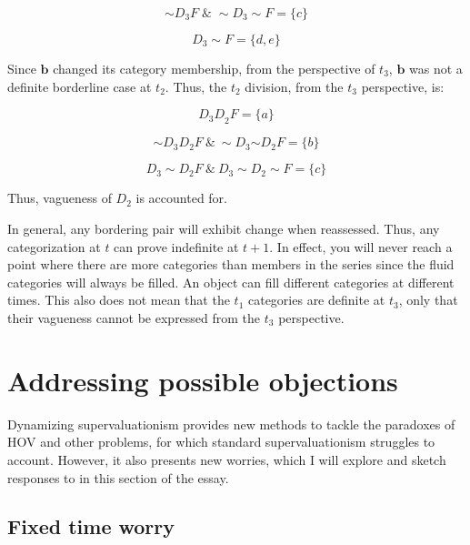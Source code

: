\[{\sim}D_{3}F \; \& \; {\sim}D_{3}{\sim}F = \{ c\}\]

\[D_{3}{\sim} F = \{ d,e\}\]

\begin{center}
  \end{center}
Since $\mathbf{b}$ changed its category membership, from the perspective
of \(t_{3}\), $\mathbf{b}$ was not a definite borderline case at
\(t_{2}\). Thus, the \(t_{2}\) division, from the \(t_{3}\) perspective,
is:

\[{D_{3}D}_{2}F = \{ a\}\]

\[\sim D_{3}D_{2}F\ \&\ \sim D_{3}{\sim D}_{2}F = \{ b\}\]

\[D_{3}\sim D_{2}F\ \&\ D_{3}\sim D_{2}\sim F = \{ c\}\]

\begin{center}
  \end{center}
Thus, vagueness of \(D_{2}\) is accounted for.

In general, any bordering pair will exhibit change when reassessed.
Thus, any categorization at $t$ can prove indefinite at $t+1$.
In effect, you will never reach a point where there are more categories
than members in the series since the fluid categories will always be
filled. An object can fill different categories at different times. This
also does not mean that the \(t_{1}\) categories are definite at
\(t_{3}\), only that their vagueness cannot be expressed from the
\(t_{3}\) perspective.

\section{Addressing possible objections}

Dynamizing supervaluationism provides new methods to tackle the
paradoxes of HOV and other problems, for which standard
supervaluationism struggles to account. However, it also presents new
worries, which I will explore and sketch responses to in this section of
the essay.

\subsection{Fixed time worry}

